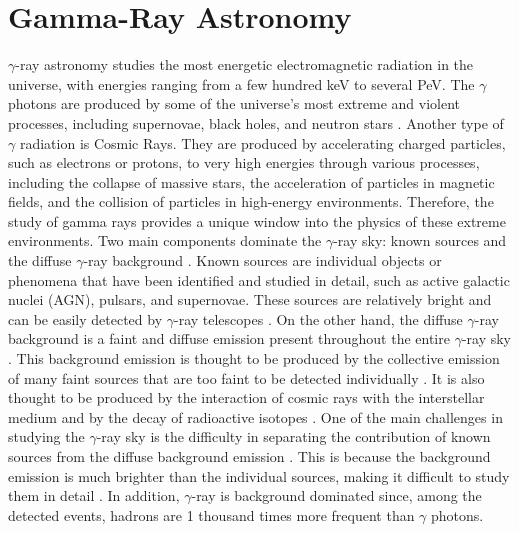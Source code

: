\section{Gamma-Ray Astronomy}
\label{s:Gamma-Ray-Astronomy}
$\gamma$-ray astronomy studies the most energetic electromagnetic radiation in the universe, with energies ranging from a few hundred keV to several PeV. The $\gamma$ photons are produced by some of the universe's most extreme and violent processes, including supernovae, black holes, and neutron stars \cite{Fishman1995}. Another type of $\gamma$ radiation is Cosmic Rays. They are produced by accelerating charged particles, such as electrons or protons, to very high energies through various processes, including the collapse of massive stars, the acceleration of particles in magnetic fields, and the collision of particles in high-energy environments. Therefore, the study of gamma rays provides a unique window into the physics of these extreme environments.
Two main components dominate the $\gamma$-ray sky: known sources and the diffuse $\gamma$-ray background \cite{Ackermann2015}. Known sources are individual objects or phenomena that have been identified and studied in detail, such as active galactic nuclei (AGN), pulsars, and supernovae. These sources are relatively bright and can be easily detected by $\gamma$-ray telescopes \cite{Abdo2010}.
On the other hand, the diffuse $\gamma$-ray background is a faint and diffuse emission present throughout the entire $\gamma$-ray sky \cite{Ackermann2015}. This background emission is thought to be produced by the collective emission of many faint sources that are too faint to be detected individually \cite{Abdo2010}. It is also thought to be produced by the interaction of cosmic rays with the interstellar medium and by the decay of radioactive isotopes \cite{bulgarelli_2019}.
One of the main challenges in studying the $\gamma$-ray sky is the difficulty in separating the contribution of known sources from the diffuse background emission \cite{Ackermann2015}. This is because the background emission is much brighter than the individual sources, making it difficult to study them in detail \cite{Abdo2010}. In addition, $\gamma$-ray is background dominated since, among the detected events, hadrons are 1 thousand times more frequent than $\gamma$ photons.
